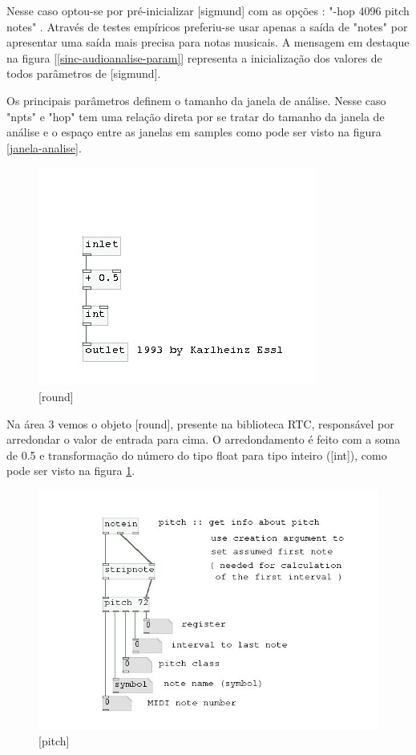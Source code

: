 \documentclass[draft]{ppgmus}
\begin{document}
Nesse caso optou-se por pré-inicializar [sigmund\texttildelow] com as
opções : "-hop 4096 pitch notes" . Através de testes empíricos preferiu-se
usar apenas a saída de "notes" por apresentar uma saída mais precisa para notas 
musicais. A mensagem em destaque na figura \ref{[sinc-audioanalise-param]} representa
a inicialização dos valores de todos parâmetros de [sigmund\texttildelow].

Os principais parâmetros definem o tamanho da janela de análise.
Nesse caso "npts" e "hop" tem uma relação direta
por se tratar do tamanho da janela de análise e o espaço
entre as janelas em samples como pode ser visto na figura \ref{janela-analise}.





\begin{figure}
\includegraphics[scale=.7]{round}
\caption{[round]}
\label{round}
\end{figure}


Na área 3 vemos o objeto [round], presente na biblioteca RTC, responsável
por arredondar o valor de entrada para cima. O arredondamento é feito com
a soma de 0.5 e transformação do número do tipo float para tipo inteiro ([int]),
como pode ser visto na figura \ref{round}.


\begin{figure}
\includegraphics[scale=.7]{pitch}
\caption{[pitch]}
\label{pitch}
\end{figure}
\end{document}
